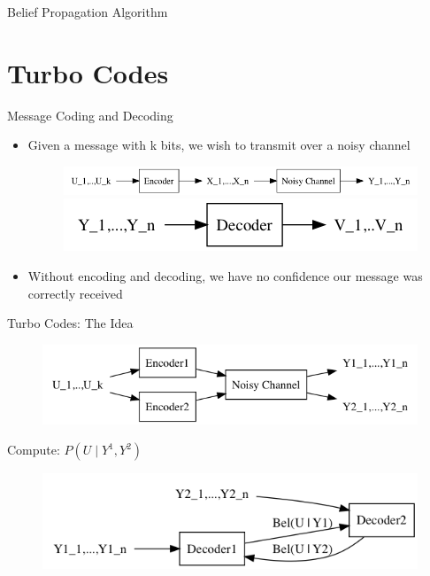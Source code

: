 \documentclass{beamer}
\begin{document}
\begin{darkframes}
\begin{frame}{Belief Propagation Algorithm}
    \end{frame}
  
  \section{Turbo Codes}
  \begin{frame}{Message Coding and Decoding}
      
      \begin{itemize}
          \item Given a message with \alert{k} bits, we wish to transmit over a noisy channel \\
      
          \begin{figure}
            \includegraphics[scale=0.4]{figures/message_code1}
            \qquad 
            \qquad
            \qquad
            \includegraphics[scale=0.4]{figures/message_code2}
        \end{figure}

        \item Without encoding and decoding, we have no confidence our message was correctly received
    \end{itemize}
  \end{frame}

    \begin{frame}{Turbo Codes: The Idea}
        \begin{figure}
            \includegraphics[scale=0.4]{figures/turbo_code1}
        \end{figure}
        
        Compute: \alert{$P(U \mid Y^1, Y^2)$}
        \begin{figure}
            \includegraphics[scale=0.4]{figures/turbo_code2}
        \end{figure}
        \qquad \\
        

\end{frame}
\end{darkframes}
\end{document}
